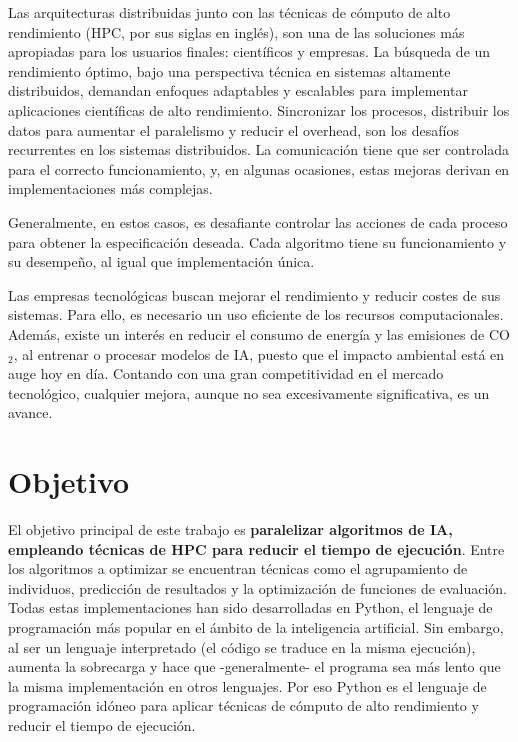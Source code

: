 	Las arquitecturas distribuidas junto con las técnicas de cómputo de alto rendimiento (HPC, por sus siglas en inglés), son una de las soluciones más apropiadas para los usuarios finales: científicos y empresas. La búsqueda de un rendimiento óptimo, bajo una perspectiva técnica en sistemas altamente distribuidos, demandan enfoques adaptables y escalables para implementar aplicaciones científicas de alto rendimiento. Sincronizar los procesos, distribuir los datos para aumentar el paralelismo y reducir el overhead, son los desafíos recurrentes en los sistemas distribuidos. La comunicación tiene que ser controlada para el correcto funcionamiento, y, en algunas ocasiones, estas mejoras derivan en implementaciones más complejas.
	
	Generalmente, en estos casos, es desafiante controlar las acciones de cada proceso para obtener la especificación deseada. Cada algoritmo tiene su funcionamiento y su desempeño, al igual que implementación única.
	
	Las empresas tecnológicas buscan mejorar el rendimiento y reducir costes de sus sistemas. Para ello, es necesario un uso eficiente de los recursos computacionales. Además, existe un interés en reducir el consumo de energía y las emisiones de CO\(_2\), al entrenar o procesar modelos de IA, puesto que el impacto ambiental está en auge hoy en día.  Contando con una gran competitividad en el mercado tecnológico, cualquier mejora, aunque no sea excesivamente significativa, es un avance.

	\newpage


\section{Objetivo}

	El objetivo principal de este trabajo es \textbf{paralelizar algoritmos de IA, empleando técnicas de HPC para reducir el tiempo de ejecución}. Entre los algoritmos a optimizar se encuentran técnicas como el agrupamiento de individuos, predicción de resultados y la optimización de funciones de evaluación. Todas estas implementaciones han sido desarrolladas en Python, el lenguaje de programación más popular en el ámbito de la inteligencia artificial\cite{sainin2021best}. Sin embargo, al ser un lenguaje interpretado (el código se traduce en la misma ejecución), aumenta la sobrecarga y hace que -generalmente- el programa sea más lento que la misma implementación en otros lenguajes. Por eso Python es el lenguaje de programación idóneo para aplicar técnicas de cómputo de alto rendimiento y reducir el tiempo de ejecución.
	
